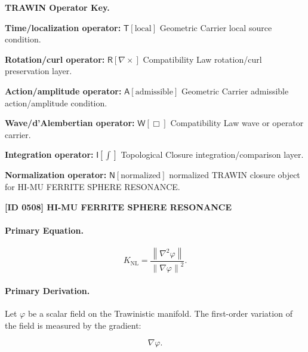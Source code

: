 \par\vspace{0.45\baselineskip}
\noindent\begin{minipage}[t]{\linewidth}
\begingroup
\small
\raggedright
\textbf{TRAWIN Operator Key.}\par
\noindent\textbf{Time/localization operator:} $\mathsf{T}\!\left[\mathrm{local}\right]$ Geometric Carrier local source condition.\par
\noindent\textbf{Rotation/curl operator:} $\mathsf{R}\!\left[\nabla\times\right]$ Compatibility Law rotation/curl preservation layer.\par
\noindent\textbf{Action/amplitude operator:} $\mathsf{A}\!\left[\mathrm{admissible}\right]$ Geometric Carrier admissible action/amplitude condition.\par
\noindent\textbf{Wave/d'Alembertian operator:} $\mathsf{W}\!\left[\Box\right]$ Compatibility Law wave or operator carrier.\par
\noindent\textbf{Integration operator:} $\mathsf{I}\!\left[\int\right]$ Topological Closure integration/comparison layer.\par
\noindent\textbf{Normalization operator:} $\mathsf{N}\!\left[\mathrm{normalized}\right]$ normalized TRAWIN closure object for HI-MU FERRITE SPHERE RESONANCE.\par
\endgroup
\end{minipage}

\clearpage
\noindent\textbf{[ID 0508] HI-MU FERRITE SPHERE RESONANCE}\par
\vspace{0.35em}
\paragraph{Primary Equation.}
\begin{equation}
K_{\mathrm{NL}}
=
\frac{\left\lVert \nabla^{2}\varphi\right\rVert}
{\left\lVert \nabla\varphi\right\rVert^{2}} .
\end{equation}

\paragraph{Primary Derivation.}
Let $\varphi$ be a scalar field on the Trawinistic manifold.  
The first-order variation of the field is measured by the gradient:

\begin{equation}
\nabla\varphi .
\end{equation}

